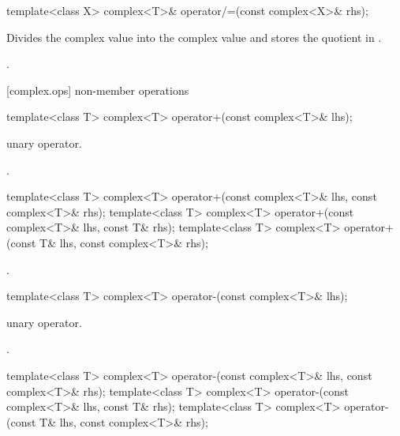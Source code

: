 %
\begin{itemdecl}
template<class X> complex<T>& operator/=(const complex<X>& rhs);
\end{itemdecl}

\begin{itemdescr}
\pnum
\effects
Divides the complex value  into the complex value
and stores the quotient in
.

\pnum
\returns
{}.
\end{itemdescr}

[complex.ops]{ non-member operations}

%
\begin{itemdecl}
template<class T> complex<T> operator+(const complex<T>& lhs);
\end{itemdecl}

\begin{itemdescr}
\pnum
\remarks
unary operator.

\pnum
\returns
{}.
\end{itemdescr}

\begin{codeblock}
template<class T>
  complex<T> operator+(const complex<T>& lhs, const complex<T>& rhs);
template<class T> complex<T> operator+(const complex<T>& lhs, const T& rhs);
template<class T> complex<T> operator+(const T& lhs, const complex<T>& rhs);
\end{codeblock}

\begin{itemdescr}
\pnum
\returns
{}.
\end{itemdescr}

%
\begin{itemdecl}
template<class T> complex<T> operator-(const complex<T>& lhs);
\end{itemdecl}

\begin{itemdescr}
\pnum
\remarks
unary operator.

\pnum
\returns
{}.
\end{itemdescr}

%
%
\begin{itemdecl}
template<class T>
  complex<T> operator-(const complex<T>& lhs, const complex<T>& rhs);
template<class T> complex<T> operator-(const complex<T>& lhs, const T& rhs);
template<class T> complex<T> operator-(const T& lhs, const complex<T>& rhs);
\end{itemdecl}

